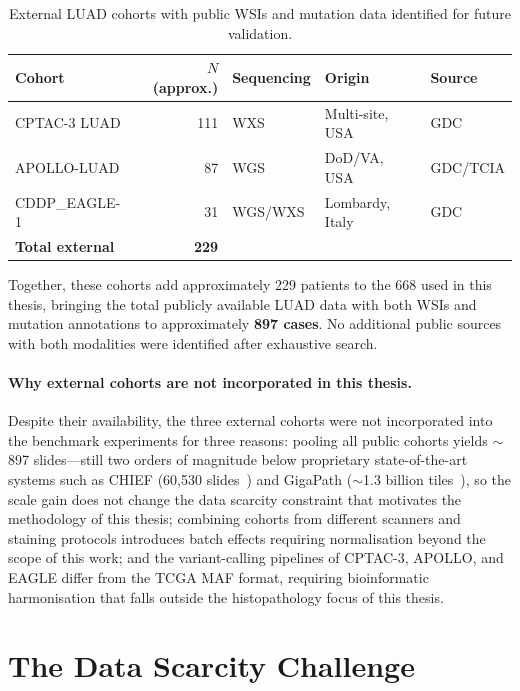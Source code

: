 \begin{table}[ht!]
\centering
\caption{External LUAD cohorts with public WSIs and mutation data
identified for future validation.}
\label{tab:external_cohorts}
\begin{tabular}{l r l l l}
\hline
\textbf{Cohort} & \textbf{$N$ (approx.)} & \textbf{Sequencing} &
\textbf{Origin} & \textbf{Source} \\
\hline
CPTAC-3 LUAD    & 111 & WXS      & Multi-site, USA    & GDC \\
APOLLO-LUAD     &  87 & WGS      & DoD/VA, USA        & GDC/TCIA \\
CDDP\_EAGLE-1   &  31 & WGS/WXS  & Lombardy, Italy    & GDC \\
\hline
\textbf{Total external} & \textbf{229} & & & \\
\hline
\end{tabular}
\end{table}

Together, these cohorts add approximately 229 patients to the 668 used
in this thesis, bringing the total publicly available LUAD data with
both WSIs and mutation annotations to approximately \textbf{897 cases}.
No additional public sources with both modalities were identified after
exhaustive search.

\paragraph{Why external cohorts are not incorporated in this thesis.}
Despite their availability, the three external cohorts were not
incorporated into the benchmark experiments for three reasons:
pooling all public cohorts yields $\sim$897 slides---still two orders of
magnitude below proprietary state-of-the-art systems such as CHIEF
(60,530 slides~\cite{wang2024chief}) and GigaPath
($\sim$1.3 billion tiles~\cite{xu2024gigapath}), so the scale gain does
not change the data scarcity constraint that motivates the methodology
of this thesis;
combining cohorts from different scanners and staining protocols
introduces batch effects requiring normalisation beyond the scope of
this work;
and the variant-calling pipelines of CPTAC-3, APOLLO, and EAGLE differ
from the TCGA MAF format, requiring bioinformatic harmonisation that
falls outside the histopathology focus of this thesis.


\section{The Data Scarcity Challenge}
\label{sec:uc:data_scarcity}

